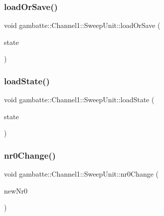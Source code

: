 \subsubsection{\texorpdfstring{load\+Or\+Save()}{loadOrSave()}}
{\footnotesize\ttfamily void gambatte\+::\+Channel1\+::\+Sweep\+Unit\+::load\+Or\+Save (\begin{DoxyParamCaption}\item[{\hyperlink{classgambatte_1_1loadsave}{loadsave} \&}]{state }\end{DoxyParamCaption})\hspace{0.3cm}{\ttfamily [inline]}}

\mbox{\label{classgambatte_1_1Channel1_1_1SweepUnit_a878dc87fd614f8cec90fdccb55e56736}} 
\subsubsection{\texorpdfstring{load\+State()}{loadState()}}
{\footnotesize\ttfamily void gambatte\+::\+Channel1\+::\+Sweep\+Unit\+::load\+State (\begin{DoxyParamCaption}\item[{\hyperlink{structgambatte_1_1SaveState}{Save\+State} const \&}]{state }\end{DoxyParamCaption})}

\mbox{\label{classgambatte_1_1Channel1_1_1SweepUnit_a61a441938851b0f4b2c8e7dfc1f2a7fa}} 
\subsubsection{\texorpdfstring{nr0\+Change()}{nr0Change()}}
{\footnotesize\ttfamily void gambatte\+::\+Channel1\+::\+Sweep\+Unit\+::nr0\+Change (\begin{DoxyParamCaption}\item[{unsigned}]{new\+Nr0 }\end{DoxyParamCaption})}

